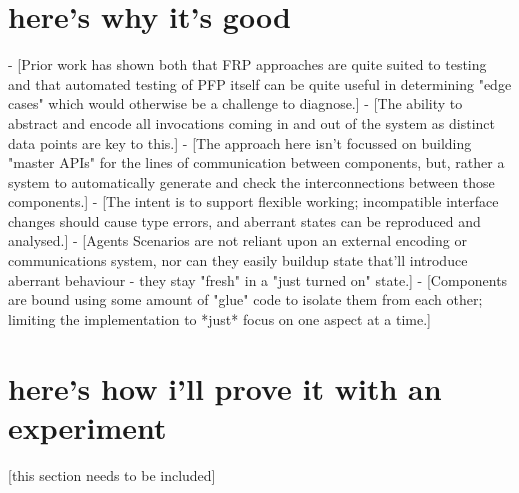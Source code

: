 \section{here's why it's good}


- [Prior work has shown both that FRP approaches are quite suited to testing\cite{perez2017testing} and that automated testing of PFP itself can be quite useful in determining "edge cases"\cite{claessen2011quickcheck} which would otherwise be a challenge to diagnose.]
	- [The ability to abstract and encode all invocations coming in and out of the system as distinct data points are key to this.]
- [The approach here isn't focussed on building "master APIs" for the lines of communication between components, but, rather a system to automatically generate and check the interconnections between those components.]
	- [The intent is to support flexible working; incompatible interface changes should cause type errors, and aberrant states can be reproduced and analysed.]
- [Agents Scenarios are not reliant upon an external encoding or communications system, nor can they easily buildup state that'll introduce aberrant behaviour - they stay "fresh" in a "just turned on" state.]
- [Components are bound using some amount of "glue" code to isolate them from each other; limiting the implementation to *just* focus on one aspect at a time.]




\section{here's how i'll prove it with an experiment}

[this section needs to be included]